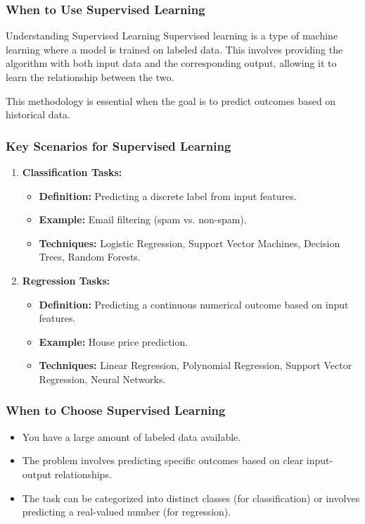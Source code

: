 \documentclass[aspectratio=169]{beamer}
\begin{document}
\begin{frame}[fragile]
    \frametitle{When to Use Supervised Learning}
    \begin{block}{Understanding Supervised Learning}
        Supervised learning is a type of machine learning where a model is trained on labeled data. This involves providing the algorithm with both input data and the corresponding output, allowing it to learn the relationship between the two.
    \end{block}
    This methodology is essential when the goal is to predict outcomes based on historical data.
\end{frame}

\begin{frame}[fragile]
    \frametitle{Key Scenarios for Supervised Learning}
    \begin{enumerate}
        \item \textbf{Classification Tasks:}
            \begin{itemize}
                \item \textbf{Definition:} Predicting a discrete label from input features.
                \item \textbf{Example:} Email filtering (spam vs. non-spam).
                \item \textbf{Techniques:} Logistic Regression, Support Vector Machines, Decision Trees, Random Forests.
            \end{itemize}
        
        \item \textbf{Regression Tasks:}
            \begin{itemize}
                \item \textbf{Definition:} Predicting a continuous numerical outcome based on input features.
                \item \textbf{Example:} House price prediction.
                \item \textbf{Techniques:} Linear Regression, Polynomial Regression, Support Vector Regression, Neural Networks.
            \end{itemize}
    \end{enumerate}
\end{frame}

\begin{frame}[fragile]
    \frametitle{When to Choose Supervised Learning}
    \begin{itemize}
        \item You have a large amount of labeled data available.
        \item The problem involves predicting specific outcomes based on clear input-output relationships.
        \item The task can be categorized into distinct classes (for classification) or involves predicting a real-valued number (for regression).
    \end{itemize}
\end{frame}
\end{document}

